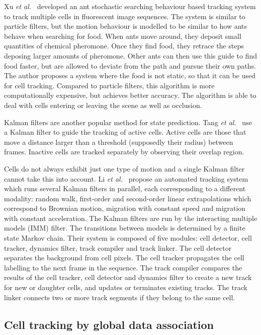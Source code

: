 Xu \emph{et al.}~\cite{xu12} developed an ant stochastic searching behaviour based tracking system to track multiple cells in fluorescent image sequences. The system is similar to particle filters, but the motion behaviour is modelled to be similar to how ants behave when searching for food. When ants move around, they deposit small quantities of chemical pheromone. Once they find food, they retrace the steps deposing larger amounts of pheromone. Other ants can then use this guide to find food faster, but are allowed to deviate from the path and pursue their own paths. The author proposes a system where the food is not static, so that it can be used for cell tracking. Compared to particle filters, this algorithm is more computationally expensive, but achieves better accuracy. The algorithm is able to deal with cells entering or leaving the scene as well as occlusion.

Kalman filters are another popular method for state prediction. Tang \emph{et al.}~\cite{tang} use a Kalman filter to guide the tracking of active cells. Active cells are those that move a distance larger than a threshold (supposedly their radius) between frames. Inactive cells are tracked separately by observing their overlap region.

Cells do not always exhibit just one type of motion and a single Kalman filter cannot take this into account. Li \emph{et al.}~\cite{li07} propose an automated tracking system which runs several Kalman filters in parallel, each corresponding to a different modality: random walk, first-order and second-order linear extrapolations which correspond to Brownian motion, migration with constant speed and migration with constant acceleration. The Kalman filters are run by the interacting multiple models (IMM) filter. The transitions between models is determined by a finite state Markov chain. Their system is composed of five modules: cell detector, cell tracker, dynamics filter, track compiler and track linker. The cell detector separates the background from cell pixels. The cell tracker propagates the cell labelling to the next frame in the sequence. The track compiler compares the results of the cell tracker, cell detector and dynamics filter to create a new track for new or daughter cells, and updates or terminates existing tracks. The track linker connects two or more track segments if they belong to the same cell.

\subsection{Cell tracking by global data association}


